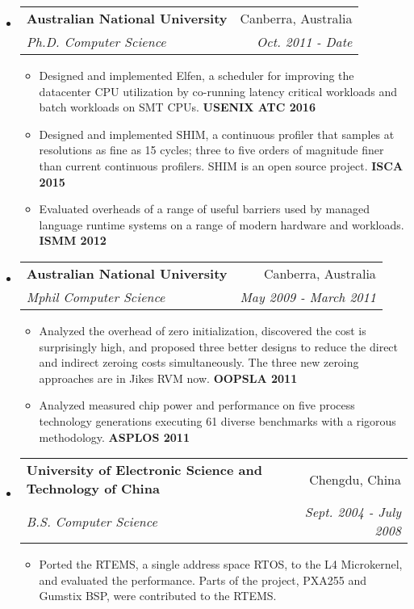 \documentclass[letterpaper,11pt]{article}
\makeatletter
\newcommand{\resitem}[1]{\item #1 \vspace{-2pt}}
\newcommand{\ressubheading}[4]{
\begin{tabular*}{6.5in}{l@{\cftdotfill{\cftsecdotsep}\extracolsep{\fill}}r}
		\textbf{#1} & #2 \\
		\textit{#3} & \textit{#4} \\
\end{tabular*}\vspace{-6pt}}
\makeatother
\begin{document}
\begin{itemize}

\item
	\ressubheading{Australian National University}{Canberra,
          Australia}{Ph.D. Computer Science}{Oct. 2011 - Date}
	\begin{itemize}
                \resitem {Designed and implemented Elfen, a scheduler for improving the datacenter CPU utilization by co-running
                  latency critical workloads and batch workloads on SMT CPUs. {\bf USENIX ATC 2016}}

                \resitem {Designed and implemented SHIM, a continuous profiler
                that samples at resolutions as fine as 15 cycles; three to five
                orders of magnitude finer than current continuous
                profilers. SHIM is an open source project. {\bf ISCA 2015}}

		\resitem {Evaluated overheads of a range of useful barriers used
                by managed language runtime systems on a range of modern
                hardware and workloads. {\bf ISMM 2012}}

	\end{itemize}

\item
	\ressubheading{Australian National University}{Canberra, Australia}{Mphil
          Computer Science }{May 2009 - March 2011}
	\begin{itemize}
          \resitem {Analyzed the overhead of zero initialization, discovered the
          cost is surprisingly high, and proposed three better designs to reduce
          the direct and indirect zeroing costs simultaneously. The three new
          zeroing approaches are in Jikes RVM now.  {\bf OOPSLA 2011}}

          \resitem {Analyzed measured chip power and performance on five
          process technology generations executing 61 diverse benchmarks with a
          rigorous methodology. {\bf ASPLOS 2011}}
          
	\end{itemize}

\item
	\ressubheading{University of Electronic Science and Technology of
          China}{Chengdu, China}{B.S. Computer Science}{Sept. 2004 - July 2008}
        \begin{itemize}         
          \resitem {Ported the RTEMS, a single address space RTOS, to the L4
          Microkernel, and evaluated the performance. Parts of the project,
          PXA255 and Gumstix BSP, were contributed to the RTEMS.}
      \end{itemize}
    \end{itemize}
\end{document}
